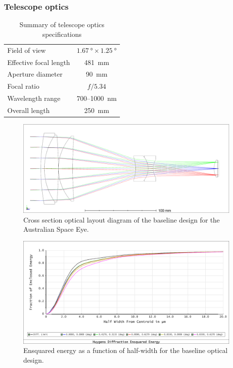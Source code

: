 \documentclass[]{iac}
\begin{document}
\subsubsection{Telescope optics}

\begin{table}[hbp]
  \caption{Summary of telescope optics specifications}
  \label{tab:optics}
  \begin{center}
    \begin{tabular}{lc}
      \toprule \rule[-1ex]{0pt}{3.5ex} Field of view &  $\SI{1.67}{\degree} \times \SI{1.25}{\degree}$ \\
      \rule[-1ex]{0pt}{3.5ex} Effective focal length & \SI{481}{\milli\metre} \\
      \rule[-1ex]{0pt}{3.5ex} Aperture diameter & \SI{90}{\milli\metre} \\
      \rule[-1ex]{0pt}{3.5ex} Focal ratio & $f/5.34$ \\
      \rule[-1ex]{0pt}{3.5ex} Wavelength range & 700--\SI{1000}{\nano\metre} \\
      \rule[-1ex]{0pt}{3.5ex}  Overall length & \SI{250}{\milli\metre} \\
      \bottomrule
    \end{tabular}
  \end{center}
\end{table}

\begin{figure}[htp]
  \center \includegraphics[width=\columnwidth]{figures/spie-layout.png}
  \caption{\label{fig:optics}Cross section optical layout diagram of the baseline design for the Australian Space Eye.}
\end{figure}

\begin{figure}[htp]
  \center \includegraphics[width=\columnwidth]{figures/ensquared.png}
  \caption{\label{fig:ensquared}Ensquared energy as a function of half-width for the baseline optical design.}
\end{figure}
\end{document}
